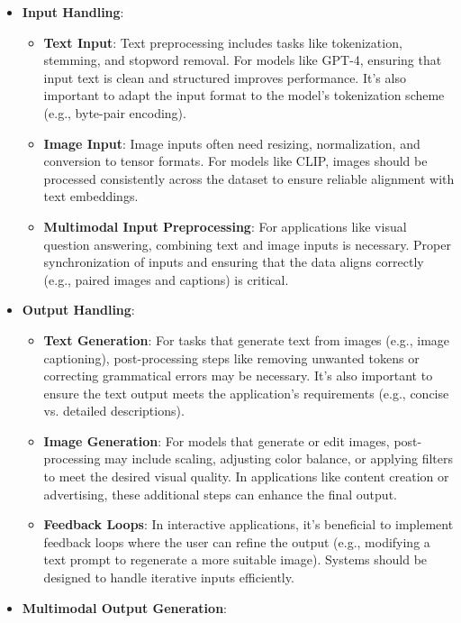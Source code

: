 \begin{itemize}
    \item \textbf{Input Handling}:
    \begin{itemize}
        \item \textbf{Text Input}: Text preprocessing includes tasks like tokenization, stemming, and stopword removal. For models like GPT-4, ensuring that input text is clean and structured improves performance. It's also important to adapt the input format to the model's tokenization scheme (e.g., byte-pair encoding).
        \item \textbf{Image Input}: Image inputs often need resizing, normalization, and conversion to tensor formats. For models like CLIP, images should be processed consistently across the dataset to ensure reliable alignment with text embeddings.
        \item \textbf{Multimodal Input Preprocessing}: For applications like visual question answering, combining text and image inputs is necessary. Proper synchronization of inputs and ensuring that the data aligns correctly (e.g., paired images and captions) is critical.
    \end{itemize}
    \item \textbf{Output Handling}:
    \begin{itemize}
        \item \textbf{Text Generation}: For tasks that generate text from images (e.g., image captioning), post-processing steps like removing unwanted tokens or correcting grammatical errors may be necessary. It's also important to ensure the text output meets the application's requirements (e.g., concise vs. detailed descriptions).
        \item \textbf{Image Generation}: For models that generate or edit images, post-processing may include scaling, adjusting color balance, or applying filters to meet the desired visual quality. In applications like content creation or advertising, these additional steps can enhance the final output.
        \item \textbf{Feedback Loops}: In interactive applications, it's beneficial to implement feedback loops where the user can refine the output (e.g., modifying a text prompt to regenerate a more suitable image). Systems should be designed to handle iterative inputs efficiently.
    \end{itemize}
    \item \textbf{Multimodal Output Generation}:
    \begin{itemize}

\end{itemize}
\end{itemize}
